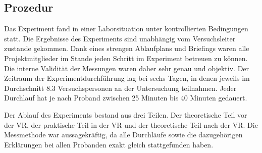 \documentclass{Paper}
\begin{document}
	\subsection{Prozedur}
Das Experiment fand in einer Laborsituation unter kontrollierten Bedingungen statt. Die
Ergebnisse des Experiments sind unabhängig vom Versuchsleiter zustande gekommen. Dank
eines strengen Ablaufplans und Briefings waren alle Projektmitglieder im Stande jeden Schritt im Experiment betreuen zu können. Die interne Validität der Messungen waren daher sehr genau und
objektiv. Der Zeitraum der Experimentdurchführung lag bei sechs Tagen, in denen jeweils im
Durchschnitt 8.3 Versuchspersonen an der Untersuchung teilnahmen. Jeder Durchlauf hat je
nach Proband zwischen 25 Minuten bis 40 Minuten gedauert.
\par
Der Ablauf des Experiments bestand aus drei Teilen. Der theoretische Teil vor der VR, der
praktische Teil in der VR und der theoretische Teil nach der VR. Die Messmethode war
aussagekräftig, da alle Durchläufe sowie die dazugehörigen Erklärungen bei allen Probanden
exakt gleich stattgefunden haben.
\end{document}
